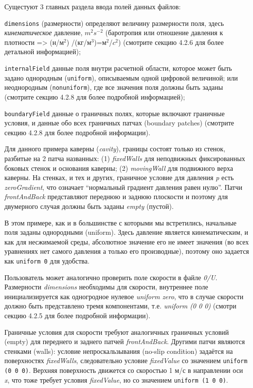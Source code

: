 Сущестуют 3 главных раздела ввода полей данных файлов:

\texttt{dimensions} (размерности) определяют величину размерности поля, здесь \textit{кинематическое}
 давление, $m^2 s^{−2}$ (баротропия или отношение давления к плотности => (н/$м^2$) /(кг/$м^3$)=$м^2$/$c^2$)
 (смотрите секцию 4.2.6 для более детальной информацией);

\texttt{internalField} данные поля внутри расчетной области, которое может быть задано однородным (\texttt{uniform}),
 описываемым одной цифровой величиной; или неоднородным (\texttt{nonuniform}), где все значения поля должны быть заданы
 (смотрите секцию 4.2.8 для более подробной информацией);

\texttt{boundaryField} данные о граничных полях, которые включают граничные условия, и данные обо всех граничных
 патчах (boundary patches) (смотрите секцию 4.2.8 для более подробной информации).

Для данного примера каверны (\textsl{cavity}), границы состоят только из стенок, разбитые на 2 патча
 названных: (1) \textsl{fixedWalls} для неподвижных фиксированных боковых стенок и основания каверны; (2) \textsl{movingWall}
для подвижного верха каверны. На стенках, и тех и других, граничное условие для давления \textsl{p} есть \textsl{zeroGradient},
 что означает “нормальный градиент давления равен нулю”. Патчи \textsl{frontAndBack} представляют переднюю и заднюю
 плоскости и поэтому для двумерного случая должны быть заданы \textsl{empty} (пустой).

В этом примере, как и в большинстве с которыми мы встретились, начальные поля заданы однородными (uniform).
 Здесь давление является кинематическим, и как для несжимаемой среды, абсолютное значение
 его не имеет значения (во всех уравнениях нет самого давления а только его производные), поэтому оно
 задается как \texttt{uniform 0} для удобства.

Пользователь может аналогично проверить поле скорости в файле \textsl{0/U}. Размерности \textsl{dimensions}
 необходимы для скорости, внутреннее поле инициализируется как одногродное нулевое \textsl{uniform zero},
 что в случае скорости должно быть представлено тремя компонентами, т.е. \textsl{uniform (0 0 0)} (смотри
 секцию 4.2.5 для более подробной информации).

Граничные условия для скорости требуют аналогичных граничных условий (empty) для переднего
 и заднего патчей \textsl{frontAndBack}. Другими патчи являются стенками (walls): условие
 непроскальзывания (no-slip condition) задаётся на поверхностях \textsl{fixedWalls}, следовательно
 условие \textsl{ﬁxedValue} со значением \texttt{uniform (0 0 0)}. Верхняя поверхность движется
 со скоростью 1 м/с в направлении оси \textit{x}, что тоже требует условия \textsl{ﬁxedValue}, но со значением 
\texttt{uniform (1 0 0)}.

